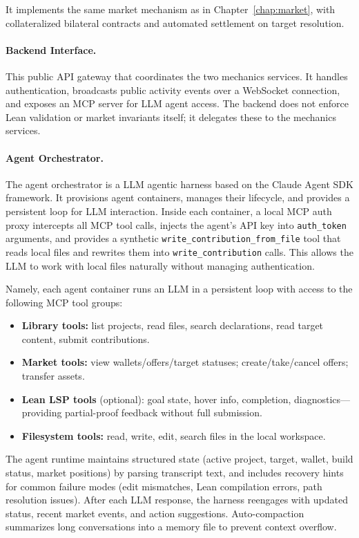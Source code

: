 It implements the same market mechanism as in Chapter~\ref{chap:market}, with collateralized bilateral contracts and automated settlement on target resolution.

\paragraph{Backend Interface.}
This public API gateway that coordinates the two mechanics services. It handles authentication, broadcasts public activity events over a WebSocket connection, and exposes an MCP server for LLM agent access. The backend does not enforce Lean validation or market invariants itself; it delegates these to the mechanics services.

\paragraph{Agent Orchestrator.}
The agent orchestrator is a LLM agentic harness based on the Claude Agent SDK framework. It provisions agent containers, manages their lifecycle, and provides a persistent loop for LLM interaction. Inside each container, a local MCP auth proxy intercepts all MCP tool calls, injects the agent's API key into \texttt{auth\_token} arguments, and provides a synthetic \texttt{write\_contribution\_from\_file} tool that reads local files and rewrites them into \texttt{write\_contribution} calls. This allows the LLM to work with local files naturally without managing authentication.


Namely, each agent container runs an LLM in a persistent loop with access to the following MCP tool groups:

\begin{itemize}
    \item \textbf{Library tools:} list projects, read files, search declarations, read target content, submit contributions.
    \item \textbf{Market tools:} view wallets/offers/target statuses; create/take/cancel offers; transfer assets.
    \item \textbf{Lean LSP tools} (optional): goal state, hover info, completion, diagnostics---providing partial-proof feedback without full submission.
    \item \textbf{Filesystem tools:} read, write, edit, search files in the local workspace.
\end{itemize}

The agent runtime maintains structured state (active project, target, wallet, build status, market positions) by parsing transcript text, and includes recovery hints for common failure modes (edit mismatches, Lean compilation errors, path resolution issues). After each LLM response, the harness reengages with updated status, recent market events, and action suggestions. Auto-compaction summarizes long conversations into a memory file to prevent context overflow.


